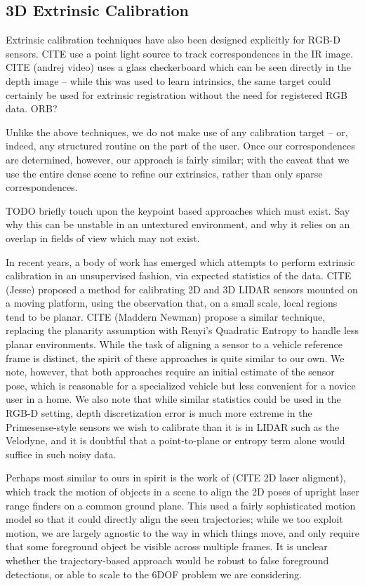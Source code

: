 \documentclass[letterpaper, 10 pt, conference]{ieeeconf}  %
\begin{document}
\subsection{3D Extrinsic Calibration}

Extrinsic calibration techniques have also been designed explicitly for RGB-D sensors. CITE use a 
point light source to track correspondences in the IR image. CITE (andrej video) uses a glass checkerboard 
which can be seen directly in the depth image -- while this was used to learn intrinsics, the same target 
could certainly be used for extrinsic registration without the need for registered RGB data. ORB?

Unlike the above techniques, we do not make use of any calibration target -- or, indeed, any structured routine 
on the part of the user. Once our correspondences are determined, however, our approach is fairly similar; with 
the caveat that we use the entire dense scene to refine our extrinsics, rather than only sparse correspondences.

TODO briefly touch upon the keypoint based approaches which must exist. Say why this can be unstable in an 
untextured environment, and why it relies on an overlap in fields of view which may not exist.

In recent years, a body of work has emerged which attempts to perform extrinsic calibration in an unsupervised 
fashion, via expected statistics of the data. CITE (Jesse) proposed a method for calibrating 2D and 3D LIDAR sensors mounted on a moving platform, 
using the observation that, on a small scale, local regions tend to be planar. CITE (Maddern Newman) propose 
a similar technique, replacing the planarity assumption with Renyi's Quadratic Entropy to handle less planar environments. 
While the task of aligning a sensor to a vehicle reference frame is distinct, the spirit of these approaches is quite 
similar to our own. We note, however, that both approaches require an initial estimate of the sensor pose, which is 
reasonable for a specialized vehicle but less convenient for a novice user in a home. We also 
note that while similar statistics could be used in the RGB-D setting, depth discretization error is much more 
extreme in the Primesense-style sensors we wish to calibrate than it is in LIDAR such as the Velodyne, and it is doubtful that a point-to-plane or entropy term alone would suffice in such noisy data.

Perhaps most similar to ours in spirit is the work of (CITE 2D laser aligment), which track the motion of objects in a 
scene to align the 2D poses of upright laser range finders on a common ground plane. This used a fairly sophisticated motion model so that it could directly 
align the seen trajectories; while we too exploit motion, we are largely agnostic to the way in which things move, and only require that some 
foreground object be visible across multiple frames. It is unclear whether the trajectory-based approach would 
be robust to false foreground detections, or able to scale to the 6DOF problem we are considering.
\end{document}

